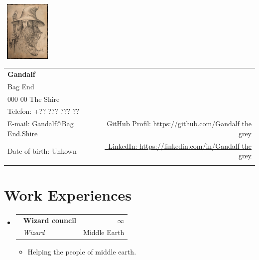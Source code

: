 \documentclass[a4paper,11pt]{article}
\makeatletter
\newcommand{\resumeSubheading}[4]{
\vspace{0.5mm}\item
    \begin{tabular*}{0.98\textwidth}[t]{l@{\extracolsep{\fill}}r}
        \textbf{#1} & \textit{\footnotesize{#4}} \\
        \textit{\footnotesize{#3}} &  \footnotesize{#2}\\
    \end{tabular*}
    \vspace{-2.4mm}
}
\newcommand{\resumeSubHeadingListStart}{\begin{itemize}[leftmargin=*,labelsep=0mm]}
\newcommand{\resumeItemListStart}{\begin{justify}\begin{itemize}[leftmargin=3ex, rightmargin=2ex, noitemsep,labelsep=1.2mm,itemsep=0mm]\small}
\newcommand{\resumeSubHeadingListEnd}{\end{itemize}\vspace{2mm}}
\newcommand{\resumeItemListEnd}{\end{itemize}\end{justify}\vspace{-2mm}}
\newcommand{\name}{Gandalf} %
\newcommand{\city}{000 00 The Shire} %
\newcommand{\addr}{Bag End} %
\newcommand{\phone}{+?? ??? ??? ??} %
\newcommand{\emaila}{Gandalf@Bag End.Shire} %
\newcommand{\birth}{Unkown} %
\makeatother
\begin{document}
\selectfont


\parbox{2.6cm}{%
\includegraphics[width=2.5cm,clip,height=2.9cm]{Gandalf.png} %
}
\parbox{\dimexpr\linewidth-3cm\relax}{
\begin{tabularx}{\linewidth}{L r} \\
  \textbf{\Large \name} & {}\\
  \addr & {} \\
  \city & {} \\
  {Telefon: \phone} & {} \\
  \href{mailto:\emaila}{E-mail: \emaila} & \href{https://github.com/}{\raisebox{0.0\height}{\footnotesize \faGithub}\ {GitHub Profil: https://github.com/Gandalf the grey}} \\
  {Date of birth: \birth} & \href{https://www.linkedin.com/}{\raisebox{0.0\height}{\footnotesize \faLinkedin}\ {LinkedIn: https://linkedin.com/in/Gandalf the grey}} \\
  \vfill
\end{tabularx}
}

\section{\textbf{Work Experiences}}
  \resumeSubHeadingListStart
    \resumeSubheading %
      {~Wizard council}{Middle Earth}
      {~Wizard}{$\infty$}
      \vspace{-2.0mm}
      \resumeItemListStart
        \item {Helping the people of middle earth.}
      \resumeItemListEnd


  \resumeSubHeadingListEnd
\vspace{-6.5mm}

\end{document}
